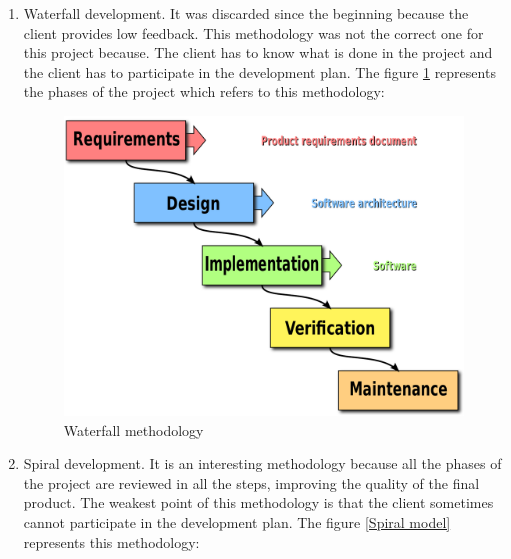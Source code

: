 \begin{enumerate}

\item Waterfall development. It was discarded since the beginning because the client provides low feedback. This methodology was not the correct one for this project because. The client has to know what is done in the project and the client has to participate in the development plan. The figure \ref{Waterfall methodology} \cite{waterfall} represents the phases of the project which refers to this methodology:

\begin{figure}[H]
\begin{centering}
\includegraphics[scale=0.2]{IMGS/waterfall_methodology.png}
\caption{Waterfall methodology \label{Waterfall methodology}}
\end{centering}
\end{figure} 

\item Spiral development. It is an interesting methodology because all the phases of the project are reviewed in all the steps, improving the quality of the final product. The weakest point of this methodology is that the client sometimes cannot participate in the development plan. The figure \ref{Spiral model} \cite{spiral} represents this methodology:


\end{enumerate}
